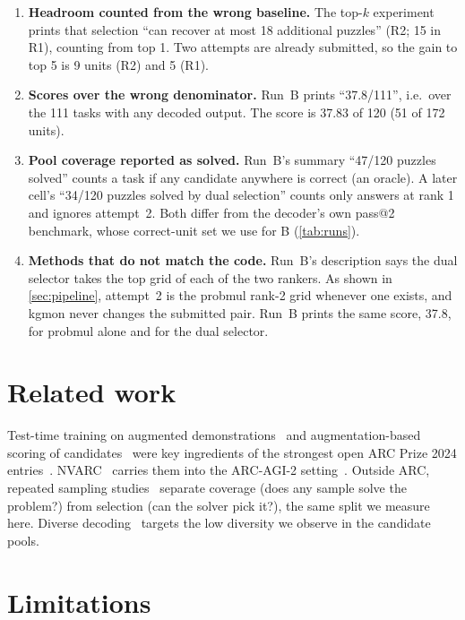 \documentclass[11pt]{article}
\newcommand{\R}[1]{R#1}
\begin{document}
\begin{enumerate}
\item \textbf{Headroom counted from the wrong baseline.} The top-$k$ experiment prints that selection ``can recover at most 18 additional puzzles'' (\R{2}; 15 in \R{1}), counting from top 1. Two attempts are already submitted, so the gain to top 5 is 9 units (\R{2}) and 5 (\R{1}).
\item \textbf{Scores over the wrong denominator.} Run~B prints ``37.8/111'', i.e.\ over the 111 tasks with any decoded output. The score is 37.83 of 120 (51 of 172 units).
\item \textbf{Pool coverage reported as solved.} Run~B's summary ``47/120 puzzles solved'' counts a task if any candidate anywhere is correct (an oracle). A later cell's ``34/120 puzzles solved by dual selection'' counts only answers at rank 1 and ignores attempt~2. Both differ from the decoder's own pass@2 benchmark, whose correct-unit set we use for B (\cref{tab:runs}).
\item \textbf{Methods that do not match the code.} Run~B's description says the dual selector takes the top grid of each of the two rankers. As shown in \cref{sec:pipeline}, attempt~2 is the probmul rank-2 grid whenever one exists, and kgmon never changes the submitted pair. Run~B prints the same score, 37.8, for probmul alone and for the dual selector.
\end{enumerate}

\section{Related work}

Test-time training on augmented demonstrations~\citep{akyurek2024ttt} and augmentation-based scoring of candidates~\citep{franzen2025poe} were key ingredients of the strongest open ARC Prize 2024 entries~\citep{chollet2024arcprize}. NVARC~\citep{nvarc2025} carries them into the ARC-AGI-2 setting~\citep{chollet2025arcagi2}.
Outside ARC, repeated sampling studies~\citep{brown2024monkeys} separate coverage (does any sample solve the problem?) from selection (can the solver pick it?), the same split we measure here.
Diverse decoding~\citep{vijayakumar2016diverse} targets the low diversity we observe in the candidate pools.

\section{Limitations}
\label{sec:limitations}
\end{document}
